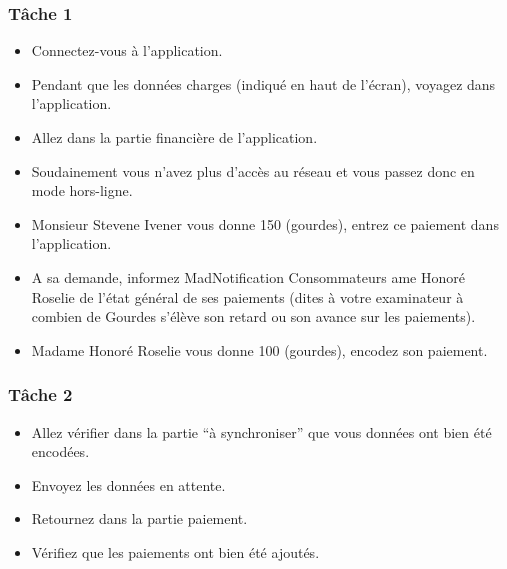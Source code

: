 \documentclass{EPL-master-thesis-covers-FR}
\begin{document}
				\subsubsection*{Tâche 1}
					\begin{itemize}
						\item Connectez-vous à l’application. 
						\item Pendant que les données charges (indiqué en haut de l’écran), voyagez dans l’application. 
						\item Allez dans la partie financière de l’application. 
						\item Soudainement vous n’avez plus d’accès au réseau et vous passez donc en mode hors-ligne. 
						\item Monsieur Stevene  Ivener vous donne 150 (gourdes), entrez ce paiement dans l’application. 
						\item A sa demande, informez MadNotification Consommateurs ame Honoré Roselie de l’état général de ses paiements (dites à votre examinateur à combien de Gourdes s’élève son retard ou son avance sur les paiements). 
						\item Madame Honoré Roselie vous donne 100 (gourdes), encodez son paiement. 
					\end{itemize}
					
				\subsubsection*{Tâche 2}
					\begin{itemize}
						\item Allez vérifier dans la partie “à synchroniser” que vous données ont bien été encodées. 
						\item Envoyez les données en attente. 
						\item Retournez dans la partie paiement. 
						\item Vérifiez que les paiements ont bien été ajoutés. 
					\end{itemize}
			
			
\newpage
\end{document}
